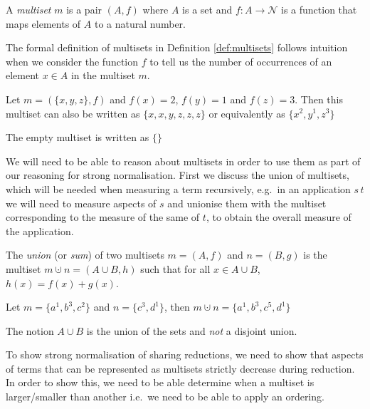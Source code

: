 \documentclass[a4paper,UKenglish,cleveref, autoref]{lipics-v2019}
\newcommand{\set}[1]{ \{ #1 \} }
\newcommand{\app}[2]{#1 \, #2}
\begin{document}
\begin{definition}[Multisets]
\label{def:multisets}
A \emph{multiset} $m$ is a pair $(A, f)$ where $A$ is a set and $f : A \rightarrow \mathcal{N}$ is a function that maps elements of $A$ to a natural number. 
\end{definition}

The formal definition of multisets in Definition \ref{def:multisets} follows intuition when we consider the function $f$ to tell us the number of occurrences of an element $x \in A$ in the multiset $m$. 

\begin{example}
Let $m = (\set{x, y, z}, f)$ and $f(x) = 2$, $f(y) = 1$ and $f(z) = 3$. Then this multiset can also be written as $\set{x, x, y, z, z, z}$ or equivalently as $\set{x^{2}, y^{1}, z^{3}}$
\end{example}

\begin{remark}
The empty multiset is written as $\set{}$
\end{remark}

We will need to be able to reason about multisets in order to use them as part of our reasoning for strong normalisation. First we discuss the union of multisets, which will be needed when measuring a term recursively, e.g.\ in an application $\app{s}{t}$ we will need to measure aspects of $s$ and unionise them with the multiset corresponding to the measure of the same of $t$, to obtain the overall measure of the application.

\begin{definition} The \emph{union} (or \emph{sum}) of two multisets $m = (A, f)$ and $n = (B, g)$ is the multiset $m \cupdot n = (A \cup B, h)$ such that for all $x \in A \cup B$, $h (x) = f(x) + g(x)$.
\end{definition}

\begin{example}
Let $m = \set{a^{1}, b^{3}, c^{2}}$ and $n = \set{c^{3}, d^{1}}$, then $m \cupdot n = \set{a^{1}, b^{3}, c^{5}, d^{1}}$ 
\end{example}

\begin{remark}
The notion $A \cup B$ is the union of the sets and \emph{not} a disjoint union.
\end{remark}

To show strong normalisation of sharing reductions, we need to show that aspects of terms that can be represented as multisets strictly decrease during reduction. In order to show this, we need to be able determine when a multiset is larger/smaller than another i.e.\ we need to be able to apply an ordering.
\end{document}
